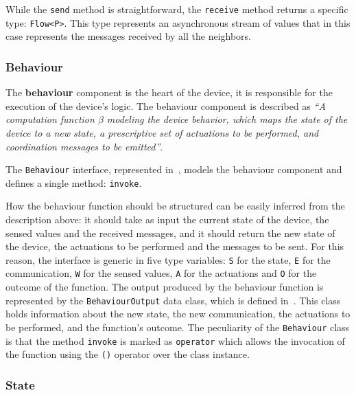 While the \texttt{send} method is straightforward, the \texttt{receive} method returns a specific type: \texttt{Flow<P>}.
This type represents an asynchronous stream of values that in this case represents the messages received by all the neighbors.

\subsubsection{Behaviour}

The \textbf{behaviour} component is the heart of the device, it is responsible for the execution of the device's logic.
The behaviour component is described as \textit{``A computation function $\beta$
	modeling the device behavior, which maps the state of the device to a new state, a prescriptive set of actuations to be performed,
	and coordination messages to be emitted''}.

The \texttt{Behaviour} interface, represented in~, models the behaviour component and defines a single method:
\texttt{invoke}.



How the behaviour function should be structured can be easily inferred from the description above: it should take as input the current state of
the device, the sensed values and the received messages, and it should return the new state of the device, the actuations to be performed and the
messages to be sent. For this reason, the interface is generic in five type variables: \texttt{S} for the state, \texttt{E} for the communication,
\texttt{W} for the sensed values, \texttt{A} for the actuations and \texttt{O} for the outcome of the function.
The output produced by the behaviour function is represented by the \texttt{BehaviourOutput} data class, which is defined
in~. This class holds information about the new state, the new communication, the actuations to be performed, and the
function's outcome.
The peculiarity of the \texttt{Behaviour} class is that the method \texttt{invoke} is marked as \texttt{operator} which allows the invocation of the
function using the \texttt{()} operator over the class instance.

\subsubsection{State}


